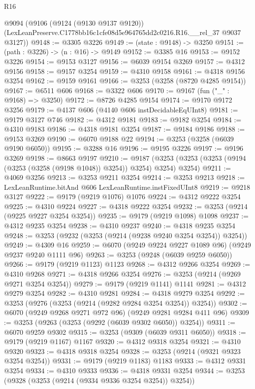 \begin{lexlean}{R16}
\begin{coremodule}
  @9094
    (@9106
      (@9124 (@9130 @9137 @9120))
      (LexLeanPreserve.C1778bb16c1cfe08d5e964765dd2c0216.R16.__rel_37 @9037 @3127))
@9148 := @3305 @3226
@9149 := (state : @9148) -> @3250
@9151 := (path : @3226) -> (n : @16) -> @9149
@9152 := @3385 @16
@9153 := @9152 @3226
@9154 := @9153 @3127
@9156 := @6039 @9154 @3269
@9157 := @4312 @9156
@9158 := @9157 @3254
@9159 := @4310 @9158
@9161 := @4318 @9156 @3254
@9162 := @9159 @9161
@9166 := @3253 (@3258 (@8720 @4285 @9154))
@9167 := @6511 @606
@9168 := @3322 @606
@9170 := @9167 (fun ("_" : @9168) => @3250)
@9172 := @8726 @4285 @9154
@9174 := @9170 @9172 @3256
@9179 := @4137 @606 (@4140 @606 instDecidableEqUInt8)
@9181 := @9179 @3127 @746
@9182 := @4312 @9181
@9183 := @9182 @3254
@9184 := @4310 @9183
@9186 := @4318 @9181 @3254
@9187 := @9184 @9186
@9188 := @9153 @3269
@9190 := @6070 @9188 @22
@9194 := @3253 (@3258 (@6039 @9190 @6050))
@9195 := @3288 @16
@9196 := @9195 @3226
@9197 := @9196 @3269
@9198 := @8663 @9197
@9210 := @9187 (@3253 (@3253 (@3253 (@9194 (@3253 (@3258 (@9198 @1048)) @3254)) @3254) @3254) @3254)
@9211 := @4069 @3256
@9213 := @3253 @9211 @3254
@9214 := @3253 @9213
@9218 := LexLeanRuntime.bitAnd @606 LexLeanRuntime.instFixedUInt8
@9219 := @9218 @3127
@9222 := @9179 (@9219 @1076) @1076
@9224 := @4312 @9222 @3254
@9225 := @4310 @9224
@9227 := @4318 @9222 @3254
@9232 := @3253 (@9214 (@9225 @9227 @3254 @3254))
@9235 := @9179 (@9219 @1098) @1098
@9237 := @4312 @9235 @3254
@9238 := @4310 @9237
@9240 := @4318 @9235 @3254
@9248 := @3253 (@9232 (@3253 (@9214 (@9238 @9240 @3254 @3254)) @3254))
@9249 := @4309 @16
@9259 := @6070 (@9249 @9224 @9227 @1089 @96) (@9249 @9237 @9240 @1111 @96)
@9263 := @3253 (@9248 (@6039 @9259 @6050))
@9266 := @9179 (@9219 @1123) @1123
@9268 := @4312 @9266 @3254
@9269 := @4310 @9268
@9271 := @4318 @9266 @3254
@9276 := @3253 (@9214 (@9269 @9271 @3254 @3254))
@9279 := @9179 (@9219 @1141) @1141
@9281 := @4312 @9279 @3254
@9282 := @4310 @9281
@9284 := @4318 @9279 @3254
@9292 := @3253 (@9276 (@3253 (@9214 (@9282 @9284 @3254 @3254)) @3254))
@9302 := @6070 (@9249 @9268 @9271 @972 @96) (@9249 @9281 @9284 @411 @96)
@9309 := @3253 (@9263 (@3253 (@9292 (@6039 @9302 @6050)) @3254))
@9311 := @6070 @9259 @9302
@9315 := @3253 (@9309 (@6039 @9311 @6050))
@9318 := @9179 (@9219 @1167) @1167
@9320 := @4312 @9318 @3254
@9321 := @4310 @9320
@9323 := @4318 @9318 @3254
@9328 := @3253 (@9214 (@9321 @9323 @3254 @3254))
@9331 := @9179 (@9219 @1183) @1183
@9333 := @4312 @9331 @3254
@9334 := @4310 @9333
@9336 := @4318 @9331 @3254
@9344 := @3253 (@9328 (@3253 (@9214 (@9334 @9336 @3254 @3254)) @3254))

\end{coremodule}
\end{lexlean}
